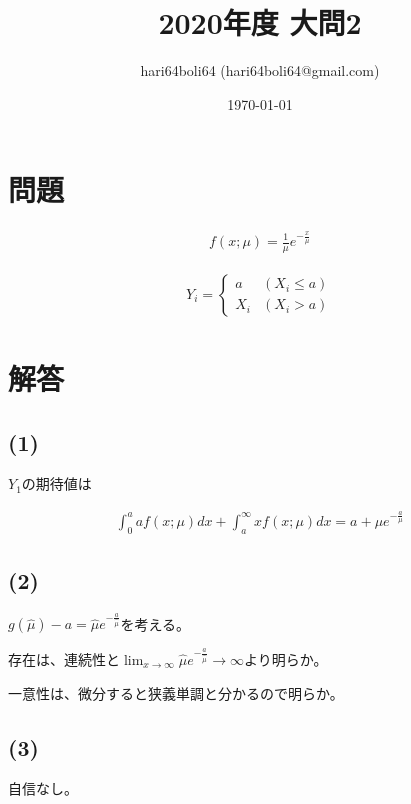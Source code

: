 \documentclass[a4paper, 10pt, dvipdfmx]{jlreq}
\begin{document}
\title{2020年度 大問2}
\author{hari64boli64 (hari64boli64@gmail.com)}
\date{\today}
\maketitle


\section{問題}

\begin{align*}
    f(x;\mu)=\frac{1}{\mu}e^{-\frac{x}{\mu}}
\end{align*}

\begin{align*}
    Y_i= \left\{
    \begin{array}{ll}
        a   & (X_i \leq a) \\
        X_i & (X_i > a)
    \end{array}
    \right.
\end{align*}

\section{解答}

\subsection*{(1)}

$Y_1$の期待値は

\begin{align*}
    \int_0^a af(x;\mu)dx + \int_a^\infty xf(x;\mu)dx=a+\mu e^{-\frac{a}{\mu}}
\end{align*}

\subsection*{(2)}

$g(\hat{\mu})-a=\hat{\mu}e^{-\frac{a}{\hat{\mu}}}$を考える。

存在は、連続性と$\lim_{x \to \infty}\hat{\mu}e^{-\frac{a}{\hat{\mu}}} \to \infty$より明らか。

一意性は、微分すると狭義単調と分かるので明らか。

\subsection*{(3)}

自信なし。
\end{document}
